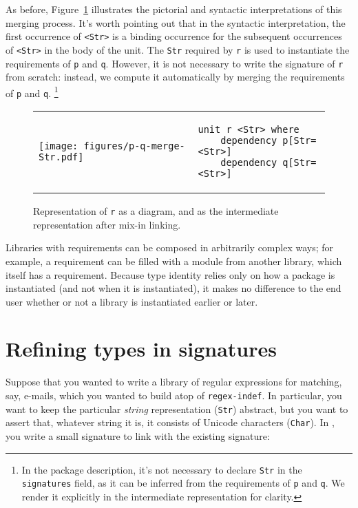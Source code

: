 As before, Figure~\ref{fig:signature-merging-interp} illustrates the
pictorial and syntactic interpretations of this merging process.  It's
worth pointing out that in the syntactic interpretation, the first
occurrence of \verb|<Str>| is a binding occurrence for the subsequent
occurrences of \verb|<Str>| in the body of the unit.  The
\verb|Str| required by \verb|r| is used to instantiate the requirements
of \verb|p| and \verb|q|. However, it is not necessary to write the
signature of \verb|r| from scratch: instead, we compute it automatically
by merging the requirements of \verb|p| and \verb|q|.%
%
\footnote{In the package description, it's not necessary to declare \texttt{Str}
in the \texttt{signatures} field, as it can be inferred from the requirements
of \texttt{p} and \texttt{q}.  We render it explicitly in the intermediate
representation for clarity.}

\begin{figure}
\begin{tabular}{p{} p{}}
\center\texttt{[image: figures/p-q-merge-Str.pdf]}
&
\vspace{2em}
\begin{lstlisting}
unit r <Str> where
    dependency p[Str=<Str>]
    dependency q[Str=<Str>]
\end{lstlisting}
\end{tabular}
\caption{Representation of \texttt{r} as a diagram, and as the intermediate
representation after mix-in linking.}
\label{fig:signature-merging-interp}
\end{figure}

Libraries with requirements can be composed in arbitrarily complex ways;
for example, a requirement can be filled with a module from another library,
which itself has a requirement.  Because type identity relies
only on how a package is instantiated (and not when it is instantiated),
it makes no difference to the end user whether or not a library
is instantiated earlier or later.

\section{Refining types in signatures}

Suppose that you wanted to write a library of regular expressions for
matching, say, e-mails, which you wanted to build atop of
\texttt{regex-indef}.  In particular, you want to keep the particular
\emph{string} representation (\verb|Str|) abstract, but you want
to assert that, whatever string it is, it consists of Unicode
characters (\verb|Char|).  In \Backpack{}, you
write a small signature to link with the existing signature:

